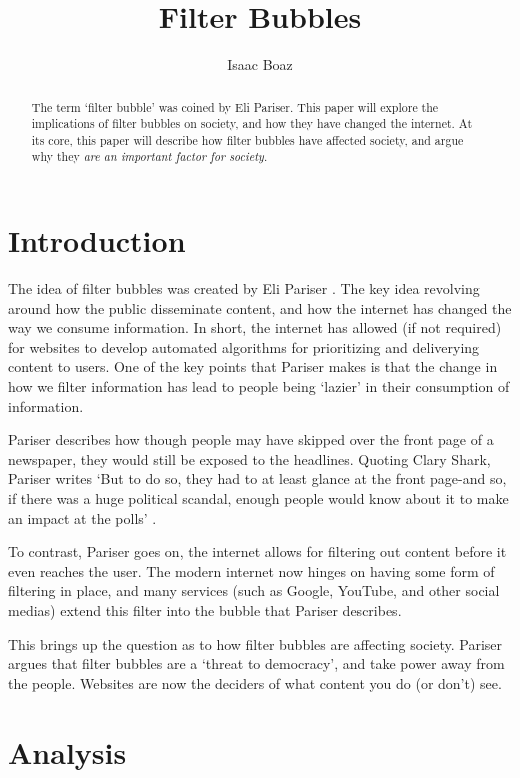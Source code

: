 \documentclass[12pt]{article}
\begin{document}
\title{Filter Bubbles}
\author{Isaac Boaz}
\maketitle

\begin{abstract}
    The term `filter bubble' was coined by Eli Pariser. This paper will explore
    the implications of filter bubbles on society, and how they have changed the
    internet. At its core, this paper will describe how filter bubbles have
    affected society, and argue why they \emph{are an important factor for
        society}.
\end{abstract}



\section{Introduction}
The idea of filter bubbles was created by Eli Pariser \cite{elifilter}. The key
idea revolving around how the public disseminate content, and how the internet
has changed the way we consume information. In short, the internet has allowed
(if not required) for websites to develop automated algorithms for prioritizing
and deliverying content to users. One of the key points that Pariser makes is
that the change in how we filter information has lead to people being `lazier'
in their consumption of information.

Pariser describes how though people may have skipped over the front page of a
newspaper, they would still be exposed to the headlines. Quoting Clary Shark,
Pariser writes `But to do so, they had to at least glance at the front page-and
so, if there was a huge political scandal, enough people would know about it to
make an impact at the polls' \cite{elifilter}.

To contrast, Pariser goes on, the internet allows for filtering out content
before it even reaches the user. The modern internet now hinges on having some
form of filtering in place, and many services (such as Google, YouTube, and
other social medias) extend this filter into the bubble that Pariser describes.

This brings up the question as to how filter bubbles are affecting society.
Pariser argues that filter bubbles are a `threat to democracy', and take power
away from the people. Websites are now the deciders of what content you do (or
don't) see.

\section{Analysis}
\end{document}
